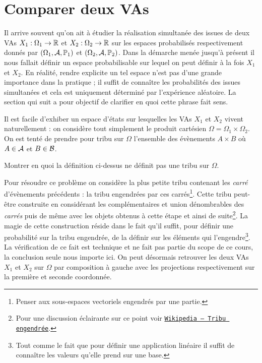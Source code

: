 \documentclass[11pt, a4paper]{article}
\begin{document}
\section{Comparer deux VAs}
\label{sec:comparerdeuxVAs}

Il arrive souvent qu'on ait à étudier la réalisation simultanée des
issues de deux VAs $X_1 : \Omega_1 \to \mathbb{R}$ et $X_2 : \Omega_2 \to \mathbb{R}$
sur les espaces probabilisés respectivement donnés par
$(\Omega_1, \mathcal{A}, \operatorname{\mathbb{P}}_1)$ et $(\Omega_2, \mathcal{A}, \operatorname{\mathbb{P}}_2)$.  Dans la
démarche menée jusqu'à présent il nous fallait définir un espace
probabilisable sur lequel on peut définir à la fois $X_1$ et $X_2$. En
réalité, rendre explicite un tel espace n'est pas d'une grande
importance dans la pratique ; il suffit de connaître les probabilités
des issues simultanées et cela est uniquement déterminé par
l'expérience aléatoire. La section qui suit a pour objectif de
clarifier en quoi cette phrase fait sens.

Il est facile d'exhiber un espace d'états sur lesquelles les VAs $X_1$
et $X_2$ vivent naturellement : on considère tout simplement le
produit cartésien $\Omega = \Omega_1\times \Omega_2$. On est tenté de
prendre pour tribu sur $\Omega$ l'ensemble des évènements $A \times B$
où $A \in \mathcal{A}$ et $B \in \mathcal{B}$.
\begin{question}
  Montrer en quoi la définition ci-dessus ne définit pas une tribu sur
  $\Omega$.
\end{question}
Pour résoudre ce problème on considère la plus petite tribu contenant
les \textit{carré} d'évènements précédents : la tribu engendrées par
ces carrés\footnote{Penser aux sous-espaces vectoriels engendrés par
  une partie.}. Cette tribu peut-être construite en considérant les
complémentaires et union dénombrables des \textit{carrés} puis de même
avec les objets obtenus à cette étape et ainsi de suite\footnote{Pour
  une discussion éclairante sur ce point voir
  \href{https://fr.wikipedia.org/wiki/Tribu_engendrée}{\texttt{Wikipedia
      -- Tribu engendrée}}.}.  La magie de cette construction réside
dans le fait qu'il suffit, pour définir une probabilité sur la tribu
engendrée, de la définir sur les éléments qui l'engendre\footnote{Tout
  comme le fait que pour définir une application linéaire il suffit de
  connaître les valeurs qu'elle prend sur une base.}. La vérification
de ce fait est technique et ne fait pas partie du scope de ce cours,
la conclusion seule nous importe ici. On peut désormais retrouver les
deux VAs $X_1$ et $X_2$ sur $\Omega$ par composition à gauche avec les
projections respectivement sur la première et seconde coordonnée.
\end{document}
